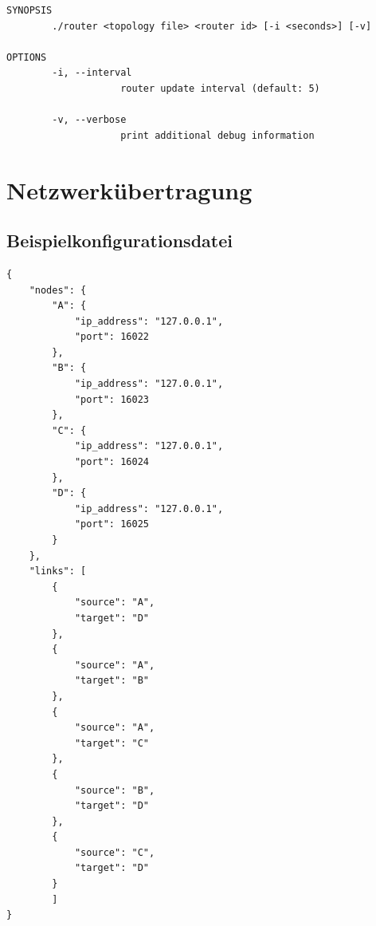 \documentclass[a4paper,ngerman]{article}
\begin{document}
\begin{Verbatim}
SYNOPSIS
        ./router <topology file> <router id> [-i <seconds>] [-v]

OPTIONS
        -i, --interval
                    router update interval (default: 5)

        -v, --verbose
                    print additional debug information
\end{Verbatim}

\section{Netzwerkübertragung}

\clearpage
\begin{appendix}

\section{Beispielkonfigurationsdatei}
\label{appendix:config}

\begin{verbatim}
{
    "nodes": {
        "A": {
            "ip_address": "127.0.0.1",
            "port": 16022
        },
        "B": {
            "ip_address": "127.0.0.1",
            "port": 16023
        },
        "C": {
            "ip_address": "127.0.0.1",
            "port": 16024
        },
        "D": {
            "ip_address": "127.0.0.1",
            "port": 16025
        }
    },
    "links": [
        {
            "source": "A",
            "target": "D"
        },
        {
            "source": "A",
            "target": "B"
        },
        {
            "source": "A",
            "target": "C"
        },
        {
            "source": "B",
            "target": "D"
        },
        {
            "source": "C",
            "target": "D"
        }
        ]
}
\end{verbatim}

\end{appendix}
\end{document}
